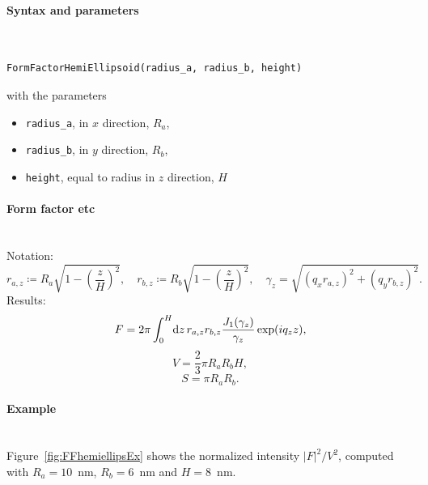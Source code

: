 \paragraph{Syntax and parameters}\strut\\[-2ex plus .2ex minus .2ex]
\begin{lstlisting}[language=python, style=eclipseboxed,numbers=none,nolol]
  FormFactorHemiEllipsoid(radius_a, radius_b, height)
\end{lstlisting}
with the parameters
\begin{itemize}
\item \texttt{radius\_a}, in $x$ direction, $R_a$,
\item \texttt{radius\_b}, in $y$ direction, $R_b$,
\item \texttt{height}, equal to radius in $z$ direction, $H$
\end{itemize}


\paragraph{Form factor etc}\strut\\
Notation:
\begin{equation*}
 r_{a,z} \coloneqq R_a \sqrt{1-\left(\dfrac{z}{H} \right)^2},\quad
 r_{b,z} \coloneqq R_b \sqrt{1-\left(\dfrac{z}{H} \right)^2}, \quad
 \gamma_z =\sqrt{(q_x r_{a,z})^2+(q_y r_{b,z})^2}.
\end{equation*}
Results:
\begin{equation*}
  F = 2\pi \int_0^{H} \!\text{d} z\, r_{a,z} r_{b,z}
                               \frac{J_1(\gamma_z)}{\gamma_z}\exp(iq_z z),
\end{equation*}
\begin{equation*}
  V = \dfrac{2}{3}\pi R_a R_bH,
\end{equation*}
\begin{equation*}
  S =\pi R_a R_b.
\end{equation*}

\paragraph{Example}\strut\\
Figure~\ref{fig:FFhemiellipsEx} shows the normalized intensity
$|F|^2/V^2$, computed with $R_a=10$~nm, $R_b=6$~nm and $H=8$~nm.

